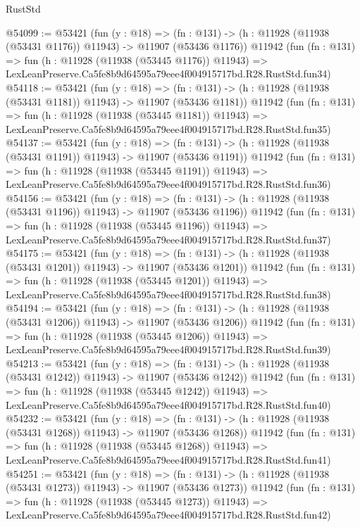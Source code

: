 \begin{lexlean}{RustStd}
\begin{coremodule}
@54099 := @53421
    (fun (y : @18) =>
    (fn : @131) -> (h : @11928 (@11938 (@53431 @1176)) @11943) -> @11907 (@53436 @1176))
    @11942
    (fun (fn : @131) =>
    fun (h : @11928 (@11938 (@53445 @1176)) @11943) =>
    LexLeanPreserve.Ca5fe8b9d64595a79eee4f004915717bd.R28.RustStd.fun34)
@54118 := @53421
    (fun (y : @18) =>
    (fn : @131) -> (h : @11928 (@11938 (@53431 @1181)) @11943) -> @11907 (@53436 @1181))
    @11942
    (fun (fn : @131) =>
    fun (h : @11928 (@11938 (@53445 @1181)) @11943) =>
    LexLeanPreserve.Ca5fe8b9d64595a79eee4f004915717bd.R28.RustStd.fun35)
@54137 := @53421
    (fun (y : @18) =>
    (fn : @131) -> (h : @11928 (@11938 (@53431 @1191)) @11943) -> @11907 (@53436 @1191))
    @11942
    (fun (fn : @131) =>
    fun (h : @11928 (@11938 (@53445 @1191)) @11943) =>
    LexLeanPreserve.Ca5fe8b9d64595a79eee4f004915717bd.R28.RustStd.fun36)
@54156 := @53421
    (fun (y : @18) =>
    (fn : @131) -> (h : @11928 (@11938 (@53431 @1196)) @11943) -> @11907 (@53436 @1196))
    @11942
    (fun (fn : @131) =>
    fun (h : @11928 (@11938 (@53445 @1196)) @11943) =>
    LexLeanPreserve.Ca5fe8b9d64595a79eee4f004915717bd.R28.RustStd.fun37)
@54175 := @53421
    (fun (y : @18) =>
    (fn : @131) -> (h : @11928 (@11938 (@53431 @1201)) @11943) -> @11907 (@53436 @1201))
    @11942
    (fun (fn : @131) =>
    fun (h : @11928 (@11938 (@53445 @1201)) @11943) =>
    LexLeanPreserve.Ca5fe8b9d64595a79eee4f004915717bd.R28.RustStd.fun38)
@54194 := @53421
    (fun (y : @18) =>
    (fn : @131) -> (h : @11928 (@11938 (@53431 @1206)) @11943) -> @11907 (@53436 @1206))
    @11942
    (fun (fn : @131) =>
    fun (h : @11928 (@11938 (@53445 @1206)) @11943) =>
    LexLeanPreserve.Ca5fe8b9d64595a79eee4f004915717bd.R28.RustStd.fun39)
@54213 := @53421
    (fun (y : @18) =>
    (fn : @131) -> (h : @11928 (@11938 (@53431 @1242)) @11943) -> @11907 (@53436 @1242))
    @11942
    (fun (fn : @131) =>
    fun (h : @11928 (@11938 (@53445 @1242)) @11943) =>
    LexLeanPreserve.Ca5fe8b9d64595a79eee4f004915717bd.R28.RustStd.fun40)
@54232 := @53421
    (fun (y : @18) =>
    (fn : @131) -> (h : @11928 (@11938 (@53431 @1268)) @11943) -> @11907 (@53436 @1268))
    @11942
    (fun (fn : @131) =>
    fun (h : @11928 (@11938 (@53445 @1268)) @11943) =>
    LexLeanPreserve.Ca5fe8b9d64595a79eee4f004915717bd.R28.RustStd.fun41)
@54251 := @53421
    (fun (y : @18) =>
    (fn : @131) -> (h : @11928 (@11938 (@53431 @1273)) @11943) -> @11907 (@53436 @1273))
    @11942
    (fun (fn : @131) =>
    fun (h : @11928 (@11938 (@53445 @1273)) @11943) =>
    LexLeanPreserve.Ca5fe8b9d64595a79eee4f004915717bd.R28.RustStd.fun42)

\end{coremodule}
\end{lexlean}
